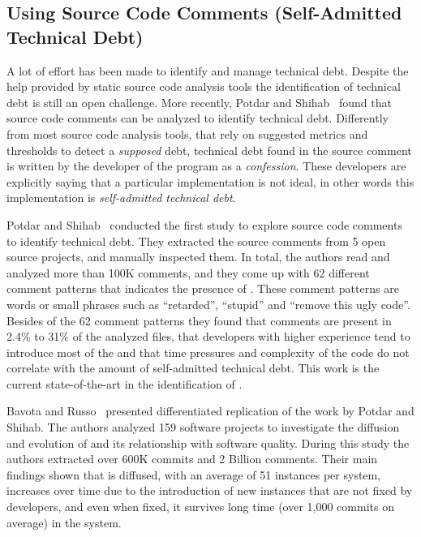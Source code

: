 \subsection{Using Source Code Comments (Self-Admitted Technical Debt)}

A lot of effort has been made to identify and manage technical debt. Despite the help provided by static source code analysis tools the identification of technical debt is still an open challenge. More recently, Potdar and Shihab~\cite{Potdar2014ICSME} found that source code comments can be analyzed to identify technical debt. Differently from most source code analysis tools, that rely on suggested metrics and thresholds to detect a \emph{supposed} debt, technical debt found in the source comment is written by the developer of the program as a \emph{confession}. These developers are explicitly saying that a particular implementation is not ideal, in other words this implementation is \emph{self-admitted technical debt}. 

Potdar and Shihab~\cite{Potdar2014ICSME} conducted the first study to explore source code comments to identify technical debt. They extracted the source comments from 5 open source projects, and manually inspected them. In total, the authors read and analyzed more than 100K comments, and they come up with 62 different comment patterns that indicates the presence of \SATD. These comment patterns are words or small phrases such as ``retarded'', ``stupid'' and ``remove this ugly code''. Besides of the 62 comment patterns they found that \SATD comments are present in 2.4\% to 31\% of the analyzed files, that developers with higher experience tend to introduce most of the \SATD and that time pressures and complexity of the code do not correlate with the amount of self-admitted technical debt. This work is the current state-of-the-art in the identification of \SATD. 

Bavota and Russo~\cite{bavota2016MSR} presented differentiated replication of the work by Potdar and Shihab. The authors analyzed 159 software projects to investigate the diffusion and evolution of \SATD and its relationship with software quality. During this study the authors extracted over 600K commits and 2 Billion comments. Their main findings shown that \SATD is diffused, with an average of 51 instances per system, increases over time due to the introduction of new instances that are not fixed by developers, and even when fixed, it survives long time (over 1,000 commits on average) in the system.

